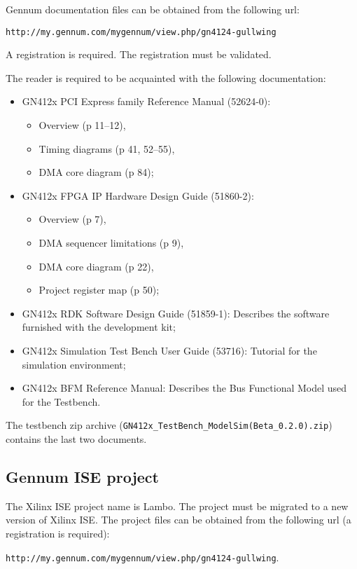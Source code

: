 \documentclass[10pt,a4paper]{cerndoc}
\begin{document}
Gennum documentation files can be obtained from the following url: 

\texttt{http://my.gennum.com/mygennum/view.php/gn4124-gullwing}

A registration is required. The registration must be validated.

The reader is required to be acquainted with the following documentation:
\begin{itemize}
  \item GN412x PCI Express family Reference Manual (52624-0):
  \begin{itemize}
    \item Overview (p 11--12),
    \item Timing diagrams (p 41, 52--55),
    \item DMA core diagram (p 84);
  \end{itemize}
  
  \item GN412x FPGA IP Hardware Design Guide (51860-2):
  \begin{itemize}
    \item Overview (p 7),
    \item DMA sequencer limitations (p 9),
    \item DMA core diagram (p 22),
    \item Project register map (p 50);
  \end{itemize}
  \item GN412x RDK Software Design Guide (51859-1):
Describes the software furnished with the development kit;
  \item GN412x Simulation Test Bench User Guide (53716):
Tutorial for the simulation environment;
  \item GN412x BFM Reference Manual:
Describes the Bus Functional Model used for the Testbench.
\end{itemize}

The testbench zip archive (\verb+GN412x_TestBench_ModelSim(Beta_0.2.0).zip+) contains the last two documents.

\subsection{Gennum ISE project}

The Xilinx ISE project name is Lambo. The project must be migrated to a new version of Xilinx ISE. 
The project files can be obtained from the following url (a registration is required): 

\texttt{http://my.gennum.com/mygennum/view.php/gn4124-gullwing}. 
\end{document}

